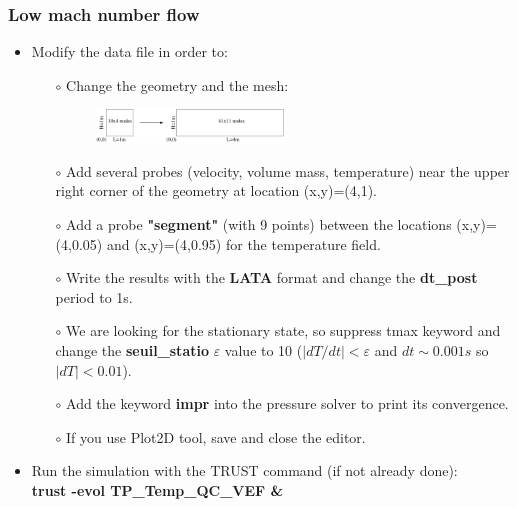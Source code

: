 \documentclass[10pt, hyperref={unicode=true,pdfusetitle, bookmarks=true,bookmarksnumbered=false,bookmarksopen=false, breaklinks=false,pdfborder={0 0 1},backref=true,colorlinks=true,linkcolor=darkblue,pageanchor}]{beamer}
\begin{document}
\begin{frame}
\frametitle{Low mach number flow}
\begin{block}{}

\begin{itemize}
\item Modify the data file in order to:
    \begin{itemize}
    \item [$\circ$] Change the geometry and the mesh:
    \begin{figure}
    \includegraphics[width=0.5\textwidth]{PICTURES/low_mach.pdf}
    \end{figure}
    \item [$\circ$] Add several probes (velocity, volume mass, temperature) near the upper right corner of the geometry at location (x,y)=(4,1).
    \item [$\circ$] Add a probe \textbf{"segment"} (with 9 points) between the locations (x,y)=(4,0.05) and (x,y)=(4,0.95) for the temperature field.
    \item [$\circ$] Write the results with the \textbf{LATA} format and change the \textbf{dt\_post} period to 1s.
    \item [$\circ$] We are looking for the stationary state, so suppress tmax keyword and change the \textbf{seuil\_statio} $\varepsilon$ value to 10 ($|dT/dt|<\varepsilon$ and $dt \sim 0.001s$ so $|dT|<0.01$).
    \item [$\circ$] Add the keyword \textbf{impr} into the pressure solver to print its convergence.
    \item [$\circ$] If you use Plot2D tool, save and close the editor.
    \end{itemize}

\item Run the simulation with the TRUST command (if not already done):\\
\textbf{trust -evol TP\_Temp\_QC\_VEF \&} \\
\end{itemize}

\end{block}
\end{frame}
\end{document}
